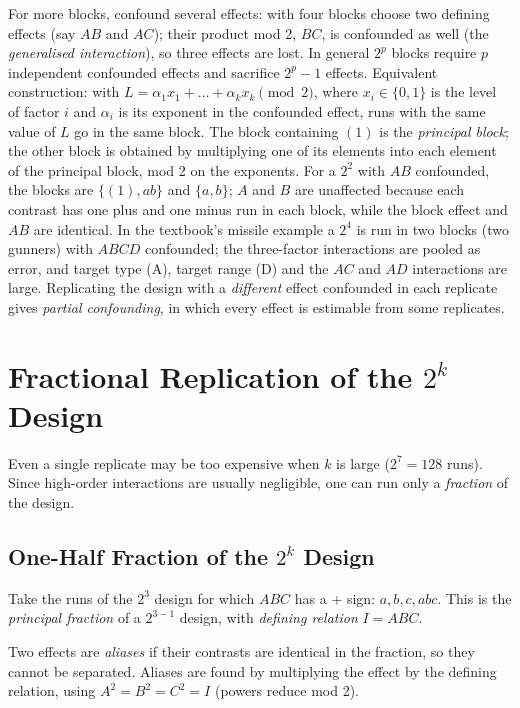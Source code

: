 For more blocks, confound several effects: with four blocks choose two defining effects (say $AB$ and $AC$); their product mod 2, $BC$, is confounded as well (the \emph{generalised interaction}), so three effects are lost. In general $2^p$ blocks require $p$ independent confounded effects and sacrifice $2^p-1$ effects. Equivalent construction: with $L=\alpha_1x_1+\dots+\alpha_kx_k \pmod 2$, where $x_i\in\{0,1\}$ is the level of factor $i$ and $\alpha_i$ is its exponent in the confounded effect, runs with the same value of $L$ go in the same block. The block containing $(1)$ is the \emph{principal block}; the other block is obtained by multiplying one of its elements into each element of the principal block, mod 2 on the exponents. For a $2^2$ with $AB$ confounded, the blocks are $\{(1),ab\}$ and $\{a,b\}$; $A$ and $B$ are unaffected because each contrast has one plus and one minus run in each block, while the block effect and $AB$ are identical. In the textbook's missile example a $2^4$ is run in two blocks (two gunners) with $ABCD$ confounded; the three-factor interactions are pooled as error, and target type (A), target range (D) and the $AC$ and $AD$ interactions are large. Replicating the design with a \emph{different} effect confounded in each replicate gives \emph{partial confounding}, in which every effect is estimable from some replicates.

\section{Fractional Replication of the $2^k$ Design}

Even a single replicate may be too expensive when $k$ is large ($2^7=128$ runs). Since high-order interactions are usually negligible, one can run only a \emph{fraction} of the design.

\subsection{One-Half Fraction of the $2^k$ Design}

Take the runs of the $2^3$ design for which $ABC$ has a $+$ sign: $a,b,c,abc$. This is the \emph{principal fraction} of a $2^{3-1}$ design, with \emph{defining relation} $I=ABC$.

\begin{definition}[Alias]
Two effects are \emph{aliases} if their contrasts are identical in the fraction, so they cannot be separated. Aliases are found by multiplying the effect by the defining relation, using $A^2=B^2=C^2=I$ (powers reduce mod 2).
\end{definition}

